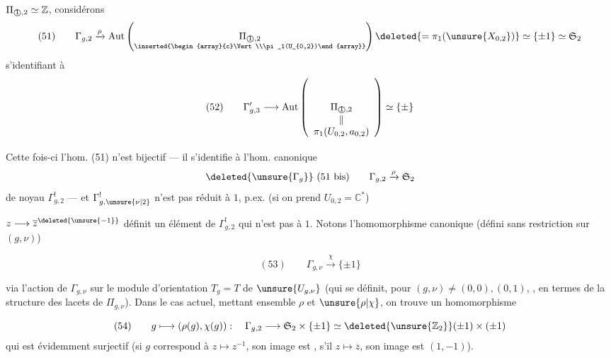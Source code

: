  $\Pi_{\text{\textcircled{1}},2}\simeq\mathbb{Z}$, considérons
\[
(51)\qquad\Gamma_{g,2}\xrightarrow{\rho}\operatorname{Aut}\left(\underset{\inserted{\begin{array}{c}\Vert\\\pi_1(U_{0,2})\end{array}}}{\Pi_{\text{\textcircled{1}},2}}\right)\deleted{=\pi_1(\unsure{X_{0,2}})}\simeq\{\pm1\}\simeq\mathfrak S_2
\]
s'identifiant à
\[
(52)\qquad\Gamma'_{g,3}\longrightarrow\operatorname{Aut}\left(\underset{\begin{array}{c}\Vert\\\pi_1(U_{0,2},a_{0,2})\end{array}}{\Pi_{\text{\textcircled{1}},2}}\right)\simeq\{\pm\}
\]

Cette fois-ci l'hom. (51) n'est  bijectif --- il s'identifie à l'hom. canonique
\[
\deleted{\unsure{\Gamma_g}}\ (51\text{ bis})\qquad\Gamma_{g,2}\xrightarrow{\rho}\mathfrak S_2
\]
de noyau $\Gamma^!_{g,2}$ --- et $\Gamma^!_{g,\unsure{\nu|2}}$ n'est pas réduit à $1$, p.ex. (si on prend $U_{0,2}=\mathbb{C}^*$)

$z\longrightarrow\overline z^{\deleted{\unsure{-1}}}$ définit un élément de $\Gamma^!_{g,2}$ qui n'est pas  à $1$. Notons   l'homomorphisme canonique (défini sans restriction sur $(g,\nu)$)

\[
(53)\qquad\Gamma_{g,\nu}\xrightarrow{\chi}\{\pm1\}
\]

via l'action de $\Gamma_{g,\nu}$ sur le module d'orientation $T_g=T$ de $\unsure{U_{g,\nu}}$  (qui se définit, pour $(g,\nu)\neq(0,0),(0,1)$, , en termes de la structure des lacets de $\Pi_{g,\nu}$). Dans le cas actuel, mettant ensemble $\rho$ et $\unsure{\rho|\chi}$, on trouve un homomorphisme

\[
(54)\qquad g\longmapsto(\rho(g),\chi(g)):\quad\Gamma_{g,2}\longrightarrow\mathfrak S_2\times\{\pm1\}
\simeq\deleted{\unsure{\mathbb{Z}_2}}(\pm1)\times(\pm1)
\]
qui est évidemment surjectif (si $g$ correspond à $z\longmapsto z^{-1}$, son image est , s'il  $z\longmapsto\overline z$, son image est $(1,-1)$).


